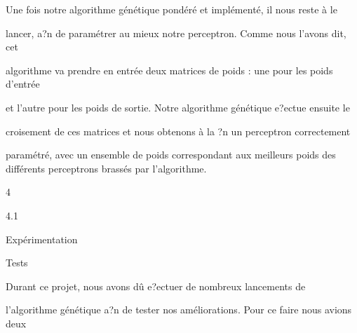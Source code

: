 \documentclass[a4paper,portrait,12pt]{article}
\begin{document}
\begin{flushleft}
Une fois notre algorithme g\'{e}n\'{e}tique pond\'{e}r\'{e} et impl\'{e}ment\'{e}, il nous reste \`{a} le
\end{flushleft}


\begin{flushleft}
lancer, a?n de param\'{e}trer au mieux notre perceptron. Comme nous l'avons dit, cet
\end{flushleft}


\begin{flushleft}
algorithme va prendre en entr\'{e}e deux matrices de poids : une pour les poids d'entr\'{e}e
\end{flushleft}


\begin{flushleft}
et l'autre pour les poids de sortie. Notre algorithme g\'{e}n\'{e}tique e?ectue ensuite le
\end{flushleft}


\begin{flushleft}
croisement de ces matrices et nous obtenons \`{a} la ?n un perceptron correctement
\end{flushleft}


\begin{flushleft}
param\'{e}tr\'{e}, avec un ensemble de poids correspondant aux meilleurs poids des diff\'{e}rents perceptrons brass\'{e}s par l'algorithme.
\end{flushleft}





4


4.1





\begin{flushleft}
Exp\'{e}rimentation
\end{flushleft}


\begin{flushleft}
Tests
\end{flushleft}





\begin{flushleft}
Durant ce projet, nous avons d\^{u} e?ectuer de nombreux lancements de
\end{flushleft}


\begin{flushleft}
l'algorithme g\'{e}n\'{e}tique a?n de tester nos am\'{e}liorations. Pour ce faire nous avions deux
\end{flushleft}
\end{document}
